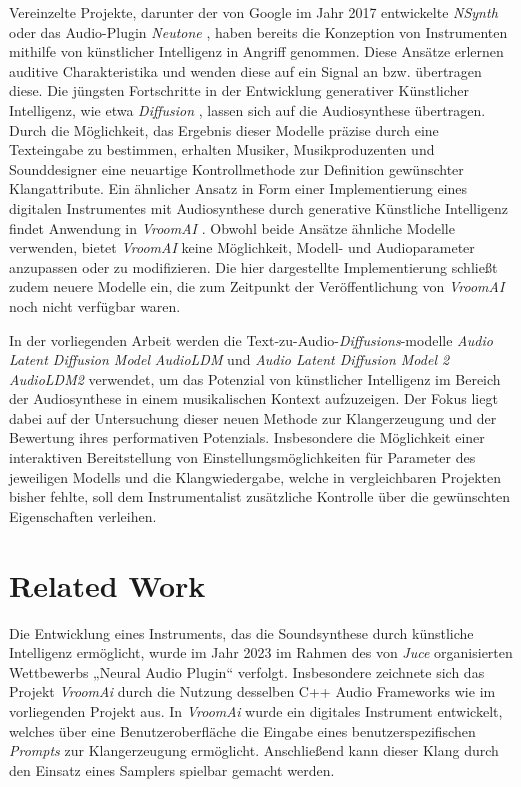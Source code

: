 \documentclass[
  a4paper,  %
  twoside,  %
  bibliography=totoc,
  headsepline,
  cleardoublepage=empty,
  parskip=half,
  draft=false
]{scrbook}
\begin{document}
Vereinzelte Projekte, darunter der von Google im Jahr 2017 entwickelte \emph{NSynth} \cite{google_ai_nsynth_2017} oder das Audio-Plugin \emph{Neutone} \cite{qosmo_neutone_nodate}, haben bereits die Konzeption von Instrumenten mithilfe von künstlicher Intelligenz in Angriff genommen. Diese Ansätze erlernen auditive Charakteristika und wenden diese auf ein Signal an bzw. übertragen diese. Die jüngsten Fortschritte in der Entwicklung generativer Künstlicher Intelligenz, wie etwa \emph{Diffusion} \cite{sohl-dickstein_deep_2015, ho_denoising_2020, nichol_improved_2021, dhariwal_diffusion_2021}, lassen sich auf die Audiosynthese übertragen. Durch die Möglichkeit, das Ergebnis dieser Modelle präzise durch eine Texteingabe zu bestimmen, erhalten Musiker, Musikproduzenten und Sounddesigner eine neuartige Kontrollmethode zur Definition gewünschter Klangattribute. Ein ähnlicher Ansatz in Form einer Implementierung eines digitalen Instrumentes mit Audiosynthese durch generative Künstliche Intelligenz findet Anwendung in \emph{VroomAI} \cite{barney_hill_vroomai_2023}.  Obwohl beide Ansätze ähnliche Modelle verwenden, bietet \emph{VroomAI} keine Möglichkeit, Modell- und Audioparameter anzupassen oder zu modifizieren. Die hier dargestellte Implementierung schließt zudem neuere Modelle ein, die zum Zeitpunkt der Veröffentlichung von \emph{VroomAI} noch nicht verfügbar waren.

In der vorliegenden Arbeit werden die Text-zu-Audio-\emph{Diffusions}-modelle \emph{Audio Latent Diffusion Model} \emph{AudioLDM} \cite{liu_audioldm_2023} und  \emph{Audio Latent Diffusion Model 2} \emph{AudioLDM2} \cite{liu_audioldm2_2023} verwendet, um das Potenzial von künstlicher Intelligenz im Bereich der Audiosynthese in einem musikalischen Kontext aufzuzeigen. Der Fokus liegt dabei auf der Untersuchung dieser neuen Methode zur Klangerzeugung und der Bewertung ihres performativen Potenzials. Insbesondere die Möglichkeit einer interaktiven Bereitstellung von Einstellungsmöglichkeiten für Parameter des jeweiligen Modells und die Klangwiedergabe, welche in vergleichbaren Projekten bisher fehlte, soll dem Instrumentalist zusätzliche Kontrolle über die gewünschten Eigenschaften verleihen.

\chapter{Related Work}


Die Entwicklung eines Instruments, das die Soundsynthese durch künstliche Intelligenz ermöglicht, wurde im Jahr 2023 im Rahmen des von \emph{Juce} \cite{noauthor_juce_nodate} organisierten Wettbewerbs „Neural Audio Plugin“ verfolgt. Insbesondere zeichnete sich das Projekt \emph{VroomAi} \cite{barney_hill_vroomai_2023} durch die Nutzung desselben C++ Audio Frameworks wie im vorliegenden Projekt aus. In \emph{VroomAi} wurde ein digitales Instrument entwickelt, welches über eine Benutzeroberfläche die Eingabe eines benutzerspezifischen \emph{Prompts} zur Klangerzeugung ermöglicht. Anschließend kann dieser Klang durch den Einsatz eines Samplers spielbar gemacht werden.
\end{document}
